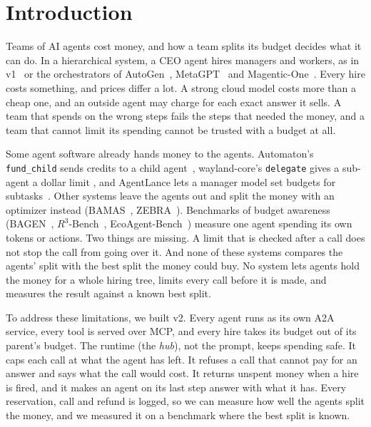 \section{Introduction}
\label{sec:intro}

Teams of AI agents cost money, and how a team splits its budget decides what it can do. In a hierarchical system, a
CEO agent hires managers and workers, as in \sys{} v1~\cite{pai2025hashiru} or the orchestrators of
AutoGen~\cite{wu2024autogen}, MetaGPT~\cite{hong2024metagpt} and Magentic-One~\cite{fourney2024magenticone}. Every hire
costs something, and prices differ a lot. A strong cloud model costs more than a cheap one, and an outside agent may
charge for each exact answer it sells. A team that spends on the wrong steps fails the steps that needed the money, and
a team that cannot limit its spending cannot be trusted with a budget at all.

Some agent software already hands money to the agents. Automaton's \texttt{fund\_child} sends credits to a child
agent~\cite{conway2026automaton}, wayland-core's \texttt{delegate} gives a sub-agent a dollar limit
\cite{ferrox2026waylandcore}, and AgentLance lets a manager model set budgets for subtasks~\cite{liu2026markets}. Other
systems leave the agents out and split the money with an optimizer instead (BAMAS~\cite{yang2026bamas},
ZEBRA~\cite{hamri2026zebra}). Benchmarks of budget awareness (BAGEN~\cite{lin2026bagen}, $R^3$-Bench~\cite{wang2026r3bench},
EcoAgent-Bench~\cite{wu2026ecoagent}) measure one agent spending its own tokens or actions. Two things are missing. A
limit that is checked after a call does not stop the call from going over it. And none of these systems compares the
agents' split with the best split the money could buy. No system lets agents hold the money for a whole hiring tree,
limits every call before it is made, and measures the result against a known best split.

To address these limitations, we built \sys{} v2. Every agent runs as its own A2A service, every tool is served over
MCP, and every hire takes its budget out of its parent's budget. The runtime (the \emph{hub}), not the prompt, keeps
spending safe. It caps each call at what the agent has left. It refuses a call that cannot pay for an answer and says
what the call would cost. It returns unspent money when a hire is fired, and it makes an agent on its last step answer
with what it has. Every reservation, call and refund is logged, so we can measure how well the agents split the money,
and we measured it on a benchmark where the best split is known.

